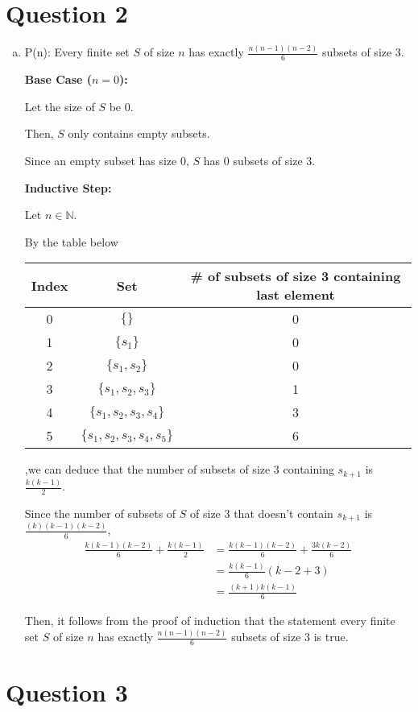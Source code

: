 \documentclass[12pt]{article}
\begin{document}
\section*{Question 2}
\begin{enumerate}[a.]
    \item

    P(n): Every finite set $S$ of size $n$ has exactly $\frac{n(n-1)(n-2)}{6}$
    subsets of size 3.

    \textbf{Base Case ($n = 0$):}

    \bigskip

    Let the size of $S$ be 0.

    \bigskip

    Then, $S$ only contains empty subsets.

    \bigskip

    Since an empty subset has size 0, $S$ has 0 subsets of size 3.

    \bigskip

    \textbf{Inductive Step:}

    \bigskip

    Let $n \in \mathbb{N}$.

    \bigskip

    By the table below

    \begin{tabular}{c | c | c}
        Index & Set & \# of subsets of size 3 containing last element\\
        \hline
        0 & $\{\}$ & 0\\
        \hline
        1 & $\{s_1\}$ & 0\\
        \hline
        2 & $\{s_1,s_2\}$ & 0\\
        \hline
        3 & $\{s_1,s_2,s_3\}$ & 1\\
        \hline
        4 & $\{s_1,s_2,s_3,s_4\}$ & 3\\
        \hline
        5 & $\{s_1,s_2,s_3,s_4,s_5\}$ & 6\\
    \end{tabular}

    ,we can deduce that the number of subsets of size 3 containing
    $s_{k+1}$ is $\frac{k(k-1)}{2}$.

    \bigskip

    Since the number of subsets of $S$ of size 3 that doesn't contain $s_{k+1}$ is
    $\frac{(k)(k-1)(k-2)}{6}$,
    \setcounter{equation}{0}
    \begin{align}
        \frac{k(k-1)(k-2)}{6} + \frac{k(k-1)}{2} &= \frac{k(k-1)(k-2)}{6} + \frac{3k(k-2)}{6}\\
        &= \frac{k(k-1)}{6}(k-2 + 3)\\
        &= \frac{(k+1)k(k-1)}{6}
    \end{align}

    Then, it follows from the proof of induction that the statement every finite
    set $S$ of size $n$ has exactly $\frac{n(n-1)(n-2)}{6}$ subsets of size 3 is true.

\end{enumerate}

\section*{Question 3}
\end{document}
